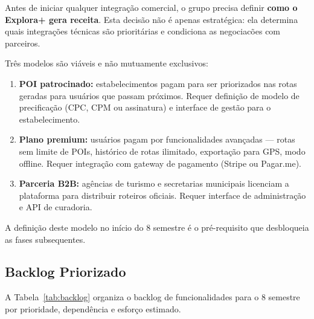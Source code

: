 \documentclass[12pt, a4paper]{article}
\begin{document}
Antes de iniciar qualquer integra\c{c}\~ao comercial, o grupo precisa definir \textbf{como o Explora+ gera receita}. Esta decis\~ao n\~ao \'e apenas estrat\'egica: ela determina quais integrações t\'ecnicas s\~ao prioritárias e condiciona as negociac\~oes com parceiros.

Tr\^es modelos s\~ao vi\'aveis e n\~ao mutuamente exclusivos:

\begin{enumerate}
  \item \textbf{POI patrocinado:} estabelecimentos pagam para ser priorizados nas rotas geradas para usu\'arios que passam pr\'oximos. Requer defini\c{c}\~ao de modelo de precifica\c{c}\~ao (CPC, CPM ou assinatura) e interface de gest\~ao para o estabelecimento.

  \item \textbf{Plano premium:} usu\'arios pagam por funcionalidades avan\c{c}adas --- rotas sem limite de POIs, hist\'orico de rotas ilimitado, exporta\c{c}\~ao para GPS, modo offline. Requer integra\c{c}\~ao com gateway de pagamento (Stripe ou Pagar.me).

  \item \textbf{Parceria B2B:} ag\^encias de turismo e secretarias municipais licenciam a plataforma para distribuir roteiros oficiais. Requer interface de administra\c{c}\~ao e API de curadoria.
\end{enumerate}

A defini\c{c}\~ao deste modelo no in\'icio do 8\textordmasculine{} semestre \'e o pr\'e-requisito que desbloqueia as fases subsequentes.

\subsection{Backlog Priorizado}

A Tabela~\ref{tab:backlog} organiza o backlog de funcionalidades para o 8\textordmasculine{} semestre por prioridade, depend\^encia e esfor\c{c}o estimado.
\end{document}
